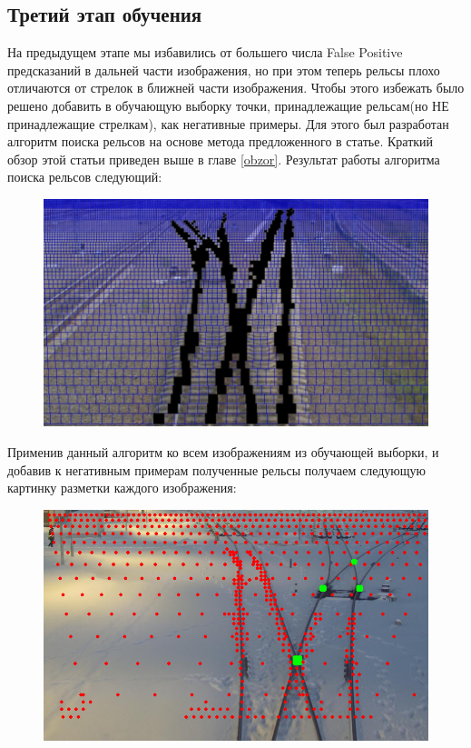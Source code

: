 \subsection{Третий этап обучения}
На предыдущем этапе мы избавились от большего числа False Positive предсказаний в дальней части изображения, но при этом теперь рельсы плохо отличаются от стрелок в ближней части изображения. 
Чтобы этого избежать было решено добавить в обучающую выборку точки, принадлежащие рельсам(но НЕ принадлежащие стрелкам), как негативные примеры. Для этого был разработан алгоритм поиска рельсов на основе метода предложенного в статье\cite{b:growing_up}. Краткий обзор этой статьи приведен выше в главе \ref{obzor}. Результат работы алгоритма поиска рельсов следующий:
\begin{figure}[h!]
	\centering
	\includegraphics[width=0.7\linewidth]{pictures/screenshot2325}
	\caption{}
	\label{fig:screenshot2325}
\end{figure}
\newpage
Применив данный алгоритм ко всем изображениям из обучающей выборки, и добавив к негативным примерам полученные рельсы получаем следующую картинку разметки каждого изображения:
\begin{figure}[h!]
	\centering
	\includegraphics[width=0.7\linewidth]{pictures/full_dataset}
	\caption{}
	\label{fig:screenshot2325}
\end{figure}

